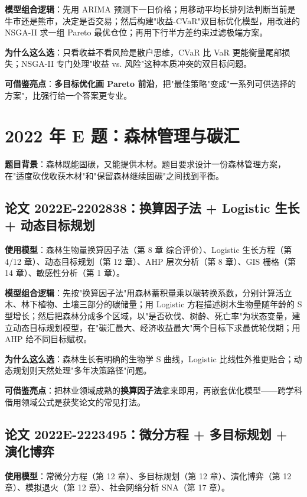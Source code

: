 \textbf{模型组合逻辑}：先用 ARIMA 预测下一日价格；用移动平均长排列法判断当前是牛市还是熊市，决定是否交易；然后构建"收益-CVaR"双目标优化模型，用改进的 NSGA-II 求一组 Pareto 最优仓位；再用下行半方差约束过滤极端方案。

\textbf{为什么这么选}：只看收益不看风险是散户思维，CVaR 比 VaR 更能衡量尾部损失；NSGA-II 专门处理"收益 vs. 风险"这种本质冲突的双目标问题。

\textbf{可借鉴亮点}：\textbf{多目标优化画 Pareto 前沿}，把"最佳策略"变成"一系列可供选择的方案"，比强行给一个答案更专业。

\section{2022 年 E 题：森林管理与碳汇}

\textbf{题目背景}：森林既能固碳，又能提供木材。题目要求设计一份森林管理方案，在"适度砍伐收获木材"和"保留森林继续固碳"之间找到平衡。

\subsection{论文 2022E-2202838：换算因子法 + Logistic 生长 + 动态目标规划}
\textbf{使用模型}：森林生物量换算因子法（第 8 章 综合评价）、Logistic 生长方程（第 4/12 章）、动态目标规划（第 12 章）、AHP 层次分析（第 8 章）、GIS 栅格（第 14 章）、敏感性分析（第 1 章）。

\textbf{模型组合逻辑}：先按"换算因子法"用森林蓄积量乘以碳转换系数，分别计算活立木、林下植物、土壤三部分的碳储量；用 Logistic 方程描述树木生物量随年龄的 S 型增长；然后把森林分成多个区域，以"是否砍伐、树龄、死亡率"为状态变量，建立动态目标规划模型，在"碳汇最大、经济收益最大"两个目标下求最优轮伐期；用 AHP 给不同目标赋权。

\textbf{为什么这么选}：森林生长有明确的生物学 S 曲线，Logistic 比线性外推更贴合；动态规划则天然处理"多年决策路径"问题。

\textbf{可借鉴亮点}：把林业领域成熟的\textbf{换算因子法}拿来即用，再嵌套优化模型——跨学科借用领域公式是获奖论文的常见打法。

\subsection{论文 2022E-2223495：微分方程 + 多目标规划 + 演化博弈}
\textbf{使用模型}：常微分方程（第 12 章）、多目标规划（第 12 章）、演化博弈（第 12 章）、模拟退火（第 12 章）、社会网络分析 SNA（第 17 章）。

